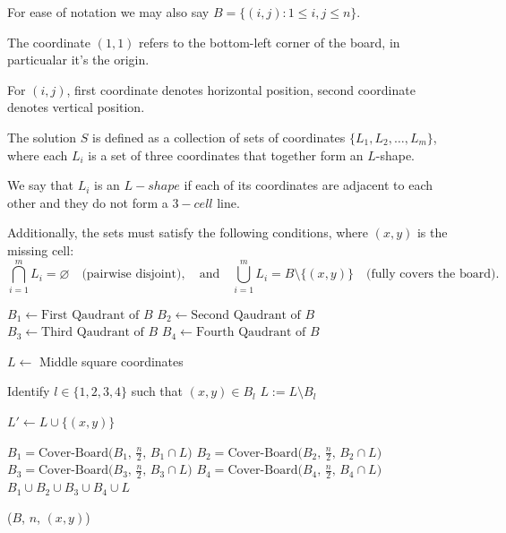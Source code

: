 \begin{questions}
\begin{soln}
      For ease of notation we may also say \(B = \{(i, j) : 1 \leq i, j \leq n\}\).

      The coordinate \((1, 1)\) refers to the bottom-left corner of the board, in particualar it's the origin.

      For \((i, j)\), first coordinate denotes horizontal position, second coordinate denotes vertical position.

      The solution \( S \) is defined as a collection of sets of coordinates \( \{L_1, L_2, \dots, L_m\} \), where each \( L_i \) is a set of three coordinates that together form an \( L \)-shape.

      We say that \(L_i\) is an \(L-shape\) if each of its coordinates are adjacent to each other and they do not form a \(3-cell\) line.

      Additionally, the sets must satisfy the following conditions, where \((x, y)\) is the missing cell:
    \[
      \bigcap_{i=1}^{m} L_i = \varnothing \quad \text{(pairwise disjoint)}, \quad \text{and} \quad \bigcup_{i=1}^{m} L_i = B \setminus \{(x, y)\} \quad \text{(fully covers the board)}.
    \]

			\begin{algorithmic}[1]
        \State {}
        \EndIf
        \State $B_1 \gets \text{First Qaudrant of } B$ 
        \State $B_2 \gets \text{Second Qaudrant of } B$ 
        \State $B_3 \gets \text{Third Qaudrant of } B$ 
        \State $B_4 \gets \text{Fourth Qaudrant of } B$ 

        \State $L \gets$ Middle square coordinates

        \State Identify $l \in \{1, 2, 3, 4\}$ such that {$(x, y) \in B_l$}
        \State $L := L \setminus B_l$

        \State $L' \gets L \cup \{(x, y)\}$

        \State $B_1 = \text{Cover-Board($B_1$, $\frac{n}{2}$, $B_1 \cap L$)} $
        \State $B_2 = \text{Cover-Board($B_2$, $\frac{n}{2}$, $B_2 \cap L$)} $
        \State $B_3 = \text{Cover-Board($B_3$, $\frac{n}{2}$, $B_3 \cap L$)} $
        \State $B_4 = \text{Cover-Board($B_4$, $\frac{n}{2}$, $B_4 \cap L$)} $
        \State \Return $B_1 \cup B_2 \cup B_3 \cup B_4 \cup L$
				\EndProcedure
			\end{algorithmic}

			\begin{algorithmic}[1]
        \State \Return {}($B$, $n$, $(x, y)$)
				\EndProcedure
			\end{algorithmic}


\end{soln}
\end{questions}
